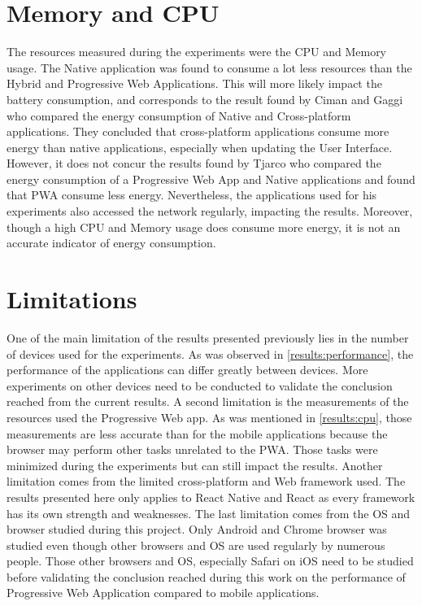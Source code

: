 \documentclass{kththesis}
\begin{document}
\section{Memory and CPU}
The resources measured during the experiments were the CPU and Memory usage. The Native application was found to consume a lot less resources than the Hybrid and Progressive Web Applications. This will more likely impact the battery consumption, and corresponds to the result found by Ciman and Gaggi \cite{ciman2017empirical} who compared the energy consumption of Native and Cross-platform applications. They concluded that cross-platform applications consume more energy than native applications, especially when updating the User Interface. However, it does not concur the results found by Tjarco \cite{PWAapplicability} who compared the energy consumption of a Progressive Web App and Native applications and found that PWA consume less energy. Nevertheless, the applications used for his experiments also accessed the network regularly, impacting the results. Moreover, though a high CPU and Memory usage does consume more energy, it is not an accurate indicator of energy consumption.

\section{Limitations}
One of the main limitation of the results presented previously lies in the number of devices used for the experiments. As was observed in \autoref{results:performance}, the performance of the applications can differ greatly between devices. More experiments on other devices need to be conducted to validate the conclusion reached from the current results. \newline
A second limitation is the measurements of the resources used the Progressive Web app. As was mentioned in \autoref{results:cpu}, those measurements are less accurate than for the mobile applications because the browser may perform other tasks unrelated to the PWA. Those tasks were minimized during the experiments but can still impact the results. \newline
Another limitation comes from the limited cross-platform and Web framework used. The results presented here only applies to React Native and React as every framework has its own strength and weaknesses. 
The last limitation comes from the OS and browser studied during this project. Only Android and Chrome browser was studied even though other browsers and OS are used regularly by numerous people. Those other browsers and OS, especially Safari on iOS need to be studied before validating the conclusion reached during this work on the performance of Progressive Web Application compared to mobile applications.
\end{document}
